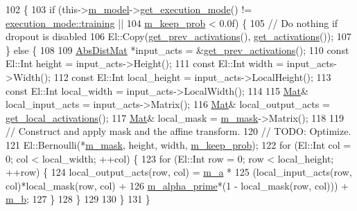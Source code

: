 \begin{DoxyCode}
102                              \{
103     \textcolor{keywordflow}{if} (this->\hyperlink{classlbann_1_1Layer_a3d9315e99574166f2f33e37b572021d2}{m\_model}->\hyperlink{classlbann_1_1model_addb40597cf29aa6d31b6a7d09ef48608}{get\_execution\_mode}() != 
      \hyperlink{base_8hpp_a2781a159088df64ed7d47cc91c4dc0a8ac185ddac8b5a8f5aa23c5b80bc12d214}{execution\_mode::training} ||
104         \hyperlink{classlbann_1_1selu__dropout_a00bd2a07703e2e918af8ae68b58ff11b}{m\_keep\_prob} < 0.0f) \{
105       \textcolor{comment}{// Do nothing if dropout is disabled}
106       El::Copy(\hyperlink{classlbann_1_1Layer_a45853df73a2e72bfaa774665a0f37ed7}{get\_prev\_activations}(), \hyperlink{classlbann_1_1Layer_a1134b1a4385af199d7272c5aa827fa99}{get\_activations}());
107     \} \textcolor{keywordflow}{else} \{
108 
109       \hyperlink{base_8hpp_a9a697a504ae84010e7439ffec862b470}{AbsDistMat} *input\_acts = &\hyperlink{classlbann_1_1Layer_a45853df73a2e72bfaa774665a0f37ed7}{get\_prev\_activations}();
110       \textcolor{keyword}{const} El::Int height = input\_acts->Height();
111       \textcolor{keyword}{const} El::Int width = input\_acts->Width();
112       \textcolor{keyword}{const} El::Int local\_height = input\_acts->LocalHeight();
113       \textcolor{keyword}{const} El::Int local\_width = input\_acts->LocalWidth();
114 
115       \hyperlink{base_8hpp_a68f11fdc31b62516cb310831bbe54d73}{Mat}& local\_input\_acts = input\_acts->Matrix();
116       \hyperlink{base_8hpp_a68f11fdc31b62516cb310831bbe54d73}{Mat}& local\_output\_acts = \hyperlink{classlbann_1_1Layer_a4248f27acebf72b7b7b3ee39c8bcb62a}{get\_local\_activations}();
117       \hyperlink{base_8hpp_a68f11fdc31b62516cb310831bbe54d73}{Mat}& local\_mask = \hyperlink{classlbann_1_1selu__dropout_a31aaadbc51d78673a84390b48d4e5950}{m\_mask}->Matrix();
118 
119       \textcolor{comment}{// Construct and apply mask and the affine transform.}
120       \textcolor{comment}{// TODO: Optimize.}
121       El::Bernoulli(*\hyperlink{classlbann_1_1selu__dropout_a31aaadbc51d78673a84390b48d4e5950}{m\_mask}, height, width, \hyperlink{classlbann_1_1selu__dropout_a00bd2a07703e2e918af8ae68b58ff11b}{m\_keep\_prob});
122       \textcolor{keywordflow}{for} (El::Int col = 0; col < local\_width; ++col) \{
123         \textcolor{keywordflow}{for} (El::Int row = 0; row < local\_height; ++row) \{
124           local\_output\_acts(row, col) = \hyperlink{classlbann_1_1selu__dropout_a52bd21583da68ba4e8a374fab259a3ef}{m\_a} *
125             (local\_input\_acts(row, col)*local\_mask(row, col) +
126              \hyperlink{classlbann_1_1selu__dropout_a8db065b13d8737e1bd4cf154ab3fe666}{m\_alpha\_prime}*(1 - local\_mask(row, col))) + \hyperlink{classlbann_1_1selu__dropout_a456fa501b7df6b52701c1aa3639ebc42}{m\_b};
127         \}
128       \}
129 
130     \}
131   \}
\end{DoxyCode}
